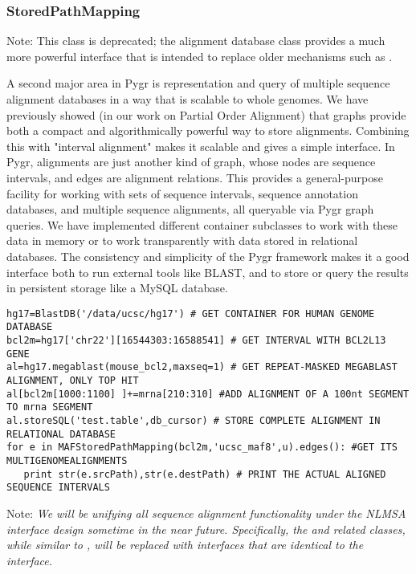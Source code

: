 \documentclass{howto}
\begin{document}
\subsubsection{StoredPathMapping}

Note: This class is deprecated; the  alignment database class provides
a much more powerful interface that is intended to replace older mechanisms
such as .

A second major area in Pygr is representation and query of multiple sequence alignment databases in a way that is scalable to whole genomes.  We have previously showed (in our work on Partial Order Alignment) that graphs provide both a compact and algorithmically powerful way to store alignments.  Combining this with "interval alignment" makes it scalable and gives a simple interface.  In Pygr, alignments are just another kind of graph, whose nodes are sequence intervals, and edges are alignment relations.  This provides a general-purpose facility for working with sets of sequence intervals, sequence annotation databases, and multiple sequence alignments, all queryable via Pygr graph queries.  We have implemented different container subclasses to work with these data in memory or to work transparently with data stored in relational databases.  The consistency and simplicity of the Pygr framework makes it a good interface both to run external tools like BLAST, and to store or query the results in persistent storage like a MySQL database.

\begin{verbatim}
hg17=BlastDB('/data/ucsc/hg17') # GET CONTAINER FOR HUMAN GENOME DATABASE
bcl2m=hg17['chr22'][16544303:16588541] # GET INTERVAL WITH BCL2L13 GENE
al=hg17.megablast(mouse_bcl2,maxseq=1) # GET REPEAT-MASKED MEGABLAST ALIGNMENT, ONLY TOP HIT
al[bcl2m[1000:1100] ]+=mrna[210:310] #ADD ALIGNMENT OF A 100nt SEGMENT TO mrna SEGMENT
al.storeSQL('test.table',db_cursor) # STORE COMPLETE ALIGNMENT IN RELATIONAL DATABASE
for e in MAFStoredPathMapping(bcl2m,'ucsc_maf8',u).edges(): #GET ITS MULTIGENOMEALIGNMENTS
   print str(e.srcPath),str(e.destPath) # PRINT THE ACTUAL ALIGNED SEQUENCE INTERVALS
\end{verbatim}

Note: {\em We will be unifying all sequence alignment functionality under the 
NLMSA interface design sometime in the near future.  Specifically, the
 and related classes, while similar to ,
will be replaced with interfaces that are identical to the 
interface.}
\end{document}
